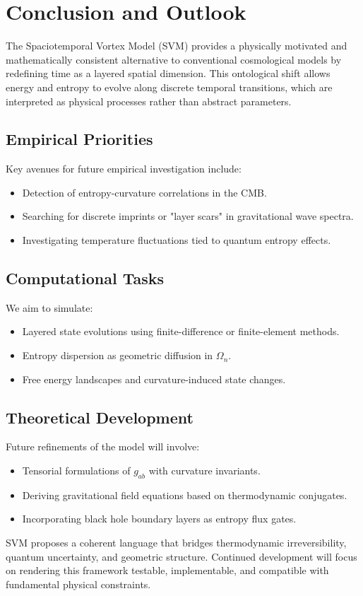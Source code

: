 
\section{Conclusion and Outlook}

The Spaciotemporal Vortex Model (SVM) provides a physically motivated and mathematically consistent alternative to conventional cosmological models by redefining time as a layered spatial dimension. This ontological shift allows energy and entropy to evolve along discrete temporal transitions, which are interpreted as physical processes rather than abstract parameters.

\subsection*{Empirical Priorities}

Key avenues for future empirical investigation include:
\begin{itemize}
    \item Detection of entropy-curvature correlations in the CMB.
    \item Searching for discrete imprints or "layer scars" in gravitational wave spectra.
    \item Investigating temperature fluctuations tied to quantum entropy effects.
\end{itemize}

\subsection*{Computational Tasks}

We aim to simulate:
\begin{itemize}
    \item Layered state evolutions using finite-difference or finite-element methods.
    \item Entropy dispersion as geometric diffusion in $\Omega_n$.
    \item Free energy landscapes and curvature-induced state changes.
\end{itemize}

\subsection*{Theoretical Development}

Future refinements of the model will involve:
\begin{itemize}
    \item Tensorial formulations of $g_{ab}$ with curvature invariants.
    \item Deriving gravitational field equations based on thermodynamic conjugates.
    \item Incorporating black hole boundary layers as entropy flux gates.
\end{itemize}

SVM proposes a coherent language that bridges thermodynamic irreversibility, quantum uncertainty, and geometric structure. Continued development will focus on rendering this framework testable, implementable, and compatible with fundamental physical constraints.
